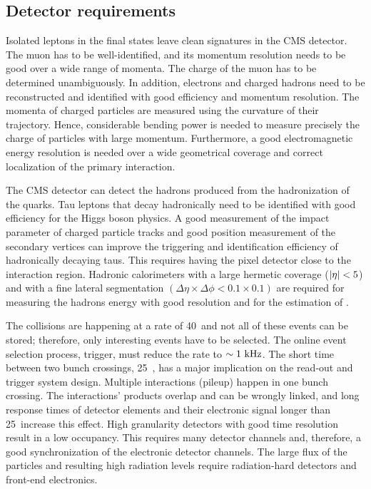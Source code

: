 \subsection{Detector requirements}
Isolated leptons in the final states leave clean signatures in the CMS detector. The muon has to be well-identified, and its momentum resolution needs to be good over a wide range of momenta. The charge of the muon has to be determined unambiguously. In addition, electrons and charged hadrons need to be reconstructed and identified with good efficiency and momentum resolution. The momenta of charged particles are measured using the curvature of their trajectory. Hence, considerable bending power is needed to measure precisely the charge of particles with large momentum. Furthermore, a good electromagnetic energy resolution is needed over a wide geometrical coverage and correct localization of the primary interaction.

The CMS detector can detect the hadrons produced from the hadronization of the quarks. Tau leptons that decay hadronically need to be identified with good efficiency for the Higgs boson physics. A good measurement of the impact parameter of charged particle tracks and good position measurement of the secondary vertices can improve the triggering and identification efficiency of hadronically decaying taus. This requires having the pixel detector close to the interaction region. Hadronic calorimeters with a large hermetic coverage ($\lvert\eta\rvert < 5$) and with a fine lateral segmentation $(\Delta \eta \times \Delta \phi < 0.1 \times 0.1)$ are required for measuring the hadrons energy with good resolution and for the estimation of \met.

The collisions are happening at a rate of 40~\mhz and not all of these events can be stored; therefore, only interesting events have to be selected. The online event selection process, trigger, must reduce the rate to $\sim 1~\text{kHz}$. The short time between two bunch crossings, 25~\ns, has a major implication on the read-out and trigger system design. Multiple \pp interactions (pileup) happen in one bunch crossing. The interactions' products overlap and can be wrongly linked, and long response times of detector elements and their electronic signal longer than 25~\ns increase this effect. High granularity detectors with good time resolution result in a low occupancy. This requires many detector channels and, therefore, a good synchronization of the electronic detector channels. The large flux of the particles and resulting high radiation levels require radiation-hard detectors and front-end electronics.

